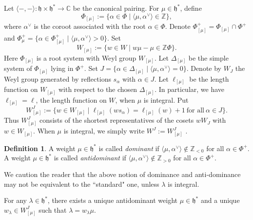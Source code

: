 \documentclass[reqno,12pt]{amsart}
\numberwithin{equation}{section}
\theoremstyle{plain}
\theoremstyle{definition}
\newtheorem{Defff}[Thm]{Definition}
\newcommand{\al}{\alpha}
\newcommand{\bil}[2]{\langle{#1},{#2}^{\vee} \rangle }
\newcommand{\hs}{ \mathfrak{h}^*}
\begin{document}
 Let $\langle-, -\rangle: \mathfrak{h} \times \mathfrak{h}^* \to \mathbb{C}$ be the canonical pairing. For $\mu\in\mathfrak{h}^*$, define 
\begin{equation*}
\Phi_{[\mu]}:=\{\alpha\in\Phi\mid\langle\mu, \alpha^\vee\rangle\in\mathbb{Z}\},
\end{equation*}
where $ \alpha^\vee$ is the coroot associated with the root $\alpha \in \Phi$. 
Denote $\Phi_{[\mu]}^+=\Phi_{[\mu]}\cap \Phi^+$ and $ \Phi_\mu^+=\{\alpha\in\Phi_{[\mu]}^+\mid\langle\mu, \alpha^\vee\rangle>0\} $. 
Set 
\[
W_{[\mu]}:=\{w\in W\mid w\mu-\mu\in \mathbb{Z}\Phi\}.
\]
Here $\Phi_{[\mu]}$ is a root system with Weyl group $W_{[\mu]}$. 
 Let $\Delta_{[\mu]}$ be the simple system of $\Phi_{[\mu]}$ lying in $\Phi^+$. Set $J=\{\alpha\in\Delta_{[\mu]}\mid\langle\mu, \alpha^\vee\rangle=0\}$. Denote by $W_J$ the Weyl group generated by reflections $s_\alpha$ with $\alpha\in J$. Let $\ell_{[\mu]}$ be the length function on $W_{[\mu]}$ with respect to the chosen $\Delta_{[\mu]}$. In particular, we have $\ell_{[\mu]}=\ell$, the length function on $W$, when $\mu$ is integral. Put
\begin{equation*}\label{ceq1}
	W_{[\mu]}^J:=\{w\in W_{[\mu]}\mid \ell_{[\mu]}(ws_\alpha)=\ell_{[\mu]}(w)+1\ \mbox{for all}\ \alpha\in J\}.
\end{equation*}
Thus $W_{[\mu]}^J$ consists of the shortest representatives of the cosets $wW_J$ with $ w\in W_{[\mu]} $. When $\mu$ is integral, we simply write $W^J:=W_{[\mu]}^J$ .

\begin{Defff} \label{D:ant-d}
A weight $ \mu\in\hs $ is called \textit{dominant} if $ \bil{\mu}{\al} \notin \mathbb{Z}_{<0}$ for all $ \al\in\Phi^+ $.
A weight $ \mu\in\hs $ is called \textit{antidominant} if $ \bil{\mu}{\al} \notin\mathbb{Z}_{>0}$ for all $ \al\in\Phi^+ $. 
\end{Defff}
We caution the reader that the above notion of dominance and anti-dominance may not be equivalent to the ``standard" one, unless $\lambda$ is integral.

For any $\lambda\in\mathfrak{h}^*$, there exists a unique antidominant weight $\mu\in\hs$ and a unique $w_{\lambda}\in W_{[\mu]}^J$ such that $\lambda=w_{\lambda}\mu$. 
\end{document}
